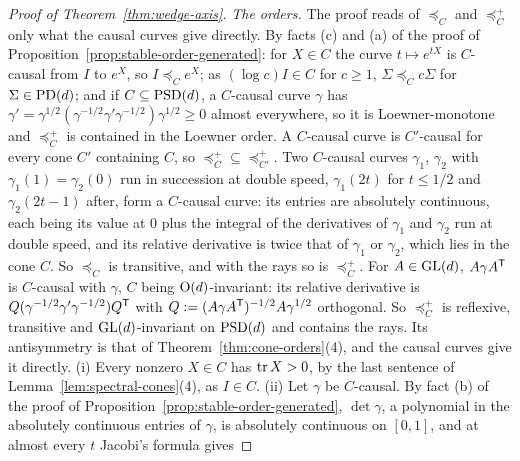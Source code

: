 \begin{proof}[Proof of Theorem~\ref{thm:wedge-axis}]
\emph{The orders.} The proof reads of $\preceq_C$ and $\preceq^+_C$ only what the causal
curves give directly. By facts (c) and (a) of the proof of Proposition~\ref{prop:stable-order-generated}: for $X \in C$
the curve $t \mapsto e^{tX}$ is $C$-causal from $I$ to $e^X$, so $I \preceq_C e^X$; as $(\log c)I \in C$ for
$c \ge 1$, $\Sigma \preceq_C c\Sigma$ for $\Sigma \in \mathrm{PD}(d)$; and if $C \subseteq \mathrm{PSD}(d)$, a $C$-causal curve
$\gamma$ has $\gamma' = \gamma^{1/2}(\gamma^{-1/2}\gamma'\gamma^{-1/2})\gamma^{1/2} \ge 0$ almost everywhere, so
it is Loewner-monotone and $\preceq^+_C$ is contained in the Loewner order. A $C$-causal curve is
$C'$-causal for every cone $C'$ containing $C$, so $\preceq^+_C \subseteq \preceq^+_{C'}$. Two $C$-causal curves
$\gamma_1$, $\gamma_2$ with $\gamma_1(1) = \gamma_2(0)$ run in succession at double speed, $\gamma_1(2t)$ for
$t \le 1/2$ and $\gamma_2(2t-1)$ after, form a $C$-causal curve: its entries are absolutely continuous, each being its value at $0$ plus the
integral of the derivatives of $\gamma_1$ and $\gamma_2$ run at double speed, and its relative derivative is twice that of
$\gamma_1$ or $\gamma_2$, which lies in the cone $C$. So $\preceq_C$ is transitive, and with the rays so is
$\preceq^+_C$. For $A \in \mathrm{GL}(d)$, $A\gamma A^{\mathsf{T}}$ is $C$-causal with $\gamma$, $C$ being $\mathrm{O}(d)$-invariant: its
relative derivative is
$Q(\gamma^{-1/2}\gamma'\gamma^{-1/2})Q^{\mathsf{T}}$ with $Q := (A\gamma A^{\mathsf{T}})^{-1/2}A\gamma^{1/2}$ orthogonal. So
$\preceq^+_C$ is reflexive, transitive and $\mathrm{GL}(d)$-invariant on $\mathrm{PSD}(d)$ and contains the rays.
Its antisymmetry is that of Theorem~\ref{thm:cone-orders}(4), and the causal curves give it directly.
(i) Every nonzero $X \in C$ has $\operatorname{tr} X > 0$, by the last sentence of Lemma~\ref{lem:spectral-cones}(4), as
$I \in C$. (ii) Let $\gamma$ be $C$-causal. By fact (b) of the proof of
Proposition~\ref{prop:stable-order-generated}, $\det\gamma$, a polynomial in the absolutely continuous entries of
$\gamma$, is absolutely continuous on $[0,1]$, and at almost every $t$ Jacobi's formula gives

\end{proof}
